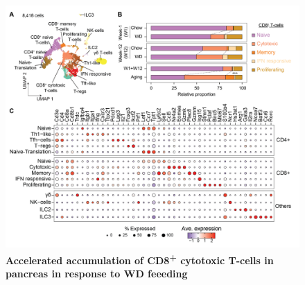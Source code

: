 \begin{figure}[htbp]
\centering
\includegraphics[width=\linewidth]{Chapter4/Fig/F2-10-01.png}
\caption[res-tcells2]{\textbf{Accelerated accumulation of CD8\textsuperscript{+} cytotoxic T-cells in pancreas in response to WD feeeding}\\
}
\label{fig2-11}
\end{figure}






